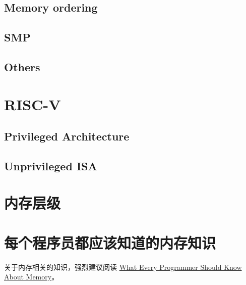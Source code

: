 

\subsection{Memory ordering} \label{sec:memory-ordering}

\subsection{SMP}

\subsection{Others}

\section{RISC-V}

\subsection{Privileged Architecture}

\subsection{Unprivileged ISA}

\section{内存层级}

\section{每个程序员都应该知道的内存知识}

关于内存相关的知识，强烈建议阅读
\href{https://people.freebsd.org/~lstewart/articles/cpumemory.pdf}{What Every Programmer Should Know About Memory}。


